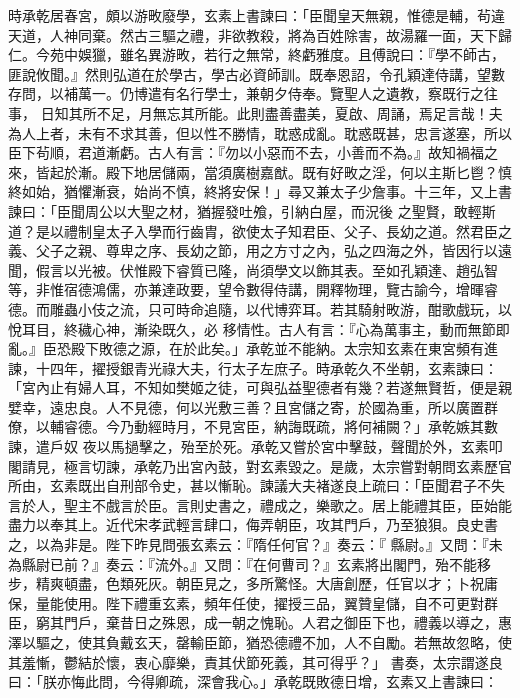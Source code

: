 \begin{pinyinscope}
 時承乾居春宮，頗以游畋廢學，玄素上書諫曰：「臣聞皇天無親，惟德是輔，茍違天道，人神同棄。然古三驅之禮，非欲教殺，將為百姓除害，故湯羅一面，天下歸仁。今苑中娛獵，雖名異游畋，若行之無常，終虧雅度。且傅說曰：『學不師古，匪說攸聞。』然則弘道在於學古，學古必資師訓。既奉恩詔，令孔穎達侍講，望數存問，以補萬一。仍博遣有名行學士，兼朝夕侍奉。覽聖人之遺教，察既行之往事，
 日知其所不足，月無忘其所能。此則盡善盡美，夏啟、周誦，焉足言哉！夫為人上者，未有不求其善，但以性不勝情，耽惑成亂。耽惑既甚，忠言遂塞，所以臣下茍順，君道漸虧。古人有言：『勿以小惡而不去，小善而不為。』故知禍福之來，皆起於漸。殿下地居儲兩，當須廣樹嘉猷。既有好畋之淫，何以主斯匕鬯？慎終如始，猶懼漸衰，始尚不慎，終將安保！」尋又兼太子少詹事。十三年，又上書諫曰：「臣聞周公以大聖之材，猶握發吐飧，引納白屋，而況後
 之聖賢，敢輕斯道？是以禮制皇太子入學而行齒胄，欲使太子知君臣、父子、長幼之道。然君臣之義、父子之親、尊卑之序、長幼之節，用之方寸之內，弘之四海之外，皆因行以遠聞，假言以光被。伏惟殿下睿質已隆，尚須學文以飾其表。至如孔穎達、趙弘智等，非惟宿德鴻儒，亦兼達政要，望令數得侍講，開釋物理，覽古諭今，增暉睿德。而雕蟲小伎之流，只可時命追隨，以代博弈耳。若其騎射畋游，酣歌戲玩，以悅耳目，終穢心神，漸染既久，必
 移情性。古人有言：『心為萬事主，動而無節即亂。』臣恐殿下敗德之源，在於此矣。」承乾並不能納。太宗知玄素在東宮頻有進諫，十四年，擢授銀青光祿大夫，行太子左庶子。時承乾久不坐朝，玄素諫曰：「宮內止有婦人耳，不知如樊姬之徒，可與弘益聖德者有幾？若遂無賢哲，便是親嬖幸，遠忠良。人不見德，何以光敷三善？且宮儲之寄，於國為重，所以廣置群僚，以輔睿德。今乃動經時月，不見宮臣，納誨既疏，將何補闕？」承乾嫉其數諫，遣戶奴
 夜以馬撾擊之，殆至於死。承乾又嘗於宮中擊鼓，聲聞於外，玄素叩閣請見，極言切諫，承乾乃出宮內鼓，對玄素毀之。是歲，太宗嘗對朝問玄素歷官所由，玄素既出自刑部令史，甚以慚恥。諫議大夫褚遂良上疏曰：「臣聞君子不失言於人，聖主不戲言於臣。言則史書之，禮成之，樂歌之。居上能禮其臣，臣始能盡力以奉其上。近代宋孝武輕言肆口，侮弄朝臣，攻其門戶，乃至狼狽。良史書之，以為非是。陛下昨見問張玄素云：『隋任何官？』奏云：『
 縣尉。』又問：『未為縣尉已前？』奏云：『流外。』又問：『在何曹司？』玄素將出閣門，殆不能移步，精爽頓盡，色類死灰。朝臣見之，多所驚怪。大唐創歷，任官以才；卜祝庸保，量能使用。陛下禮重玄素，頻年任使，擢授三品，翼贊皇儲，自不可更對群臣，窮其門戶，棄昔日之殊恩，成一朝之愧恥。人君之御臣下也，禮義以導之，惠澤以驅之，使其負戴玄天，罄輸臣節，猶恐德禮不加，人不自勵。若無故忽略，使其羞慚，鬱結於懷，衷心靡樂，責其伏節死義，其可得乎？」
 書奏，太宗謂遂良曰：「朕亦悔此問，今得卿疏，深會我心。」承乾既敗德日增，玄素又上書諫曰：




\end{pinyinscope}
